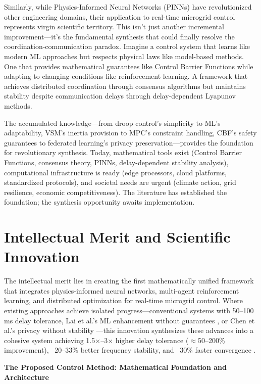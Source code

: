 \documentclass[12pt]{article}
\begin{document}
Similarly, while Physics-Informed Neural Networks (PINNs) have revolutionized other engineering domains, their application to real-time microgrid control represents virgin scientific territory. This isn't just another incremental improvement---it's the fundamental synthesis that could finally resolve the coordination-communication paradox. Imagine a control system that learns like modern ML approaches but respects physical laws like model-based methods. One that provides mathematical guarantees like Control Barrier Functions while adapting to changing conditions like reinforcement learning. A framework that achieves distributed coordination through consensus algorithms but maintains stability despite communication delays through delay-dependent Lyapunov methods.

The accumulated knowledge---from droop control's simplicity to ML's adaptability, VSM's inertia provision to MPC's constraint handling, CBF's safety guarantees to federated learning's privacy preservation---provides the foundation for revolutionary synthesis. Today, mathematical tools exist (Control Barrier Functions, consensus theory, PINNs, delay-dependent stability analysis), computational infrastructure is ready (edge processors, cloud platforms, standardized protocols), and societal needs are urgent (climate action, grid resilience, economic competitiveness). The literature has established the foundation; the synthesis opportunity awaits implementation.
\vspace{-0.5cm}
\section{Intellectual Merit and Scientific Innovation}

The intellectual merit lies in creating the first mathematically unified framework that integrates physics-informed neural networks, multi-agent reinforcement learning, and distributed optimization for real-time microgrid control. Where existing approaches achieve isolated progress---conventional systems with 50--100 ms delay tolerance, Lai et al.'s ML enhancement without guarantees \cite{lai2023}, or Chen et al.'s privacy without stability \cite{chen2024}---this innovation synthesizes these advances into a cohesive system achieving 1.5×--3× higher delay tolerance ($\approx$50--200\% improvement), ~20--33\% better frequency stability, and ~30\% faster convergence \cite{bevrani2021,palizban2014,our2024comparative}.

\textbf{The Proposed Control Method: Mathematical Foundation and Architecture}
\end{document}
